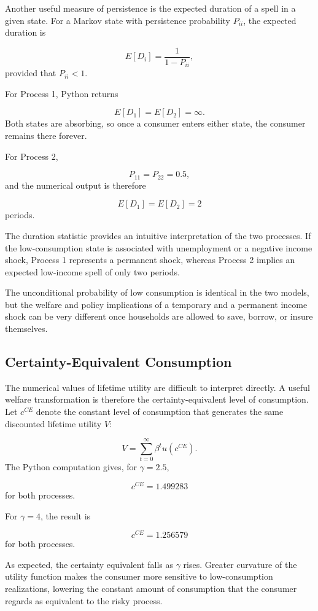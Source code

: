 \documentclass[11pt]{article}
\begin{document}
Another useful measure of persistence is the expected duration of a spell in a
given state. For a Markov state with persistence probability $P_{ii}$, the
expected duration is

\[
E[D_i]=\frac{1}{1-P_{ii}},
\]
provided that $P_{ii}<1$.

For Process 1, Python returns

\[
E[D_1]=E[D_2]=\infty.
\]
Both states are absorbing, so once a consumer enters either state, the consumer
remains there forever.

For Process 2,

\[
P_{11}=P_{22}=0.5,
\]
and the numerical output is therefore

\[
\boxed{
E[D_1]=E[D_2]=2
}
\]
periods.

The duration statistic provides an intuitive interpretation of the two processes.
If the low-consumption state is associated with unemployment or a negative
income shock, Process 1 represents a permanent shock, whereas Process 2 implies
an expected low-income spell of only two periods.

The unconditional probability of low consumption is identical in the two
models, but the welfare and policy implications of a temporary and a permanent
income shock can be very different once households are allowed to save,
borrow, or insure themselves.

\subsection*{Certainty-Equivalent Consumption}

The numerical values of lifetime utility are difficult to interpret directly.
A useful welfare transformation is therefore the certainty-equivalent level of
consumption. Let $c^{CE}$ denote the constant level of consumption that generates
the same discounted lifetime utility $V$:

\[
V=
\sum_{t=0}^{\infty}
\beta^t u(c^{CE}).
\]
The Python computation gives, for $\gamma=2.5$,

\[
\boxed{
c^{CE}=1.499283
}
\]
for both processes.

For $\gamma=4$, the result is

\[
\boxed{
c^{CE}=1.256579
}
\]
for both processes.

As expected, the certainty equivalent falls as $\gamma$ rises. Greater curvature
of the utility function makes the consumer more sensitive to low-consumption
realizations, lowering the constant amount of consumption that the consumer
regards as equivalent to the risky process.
\end{document}
